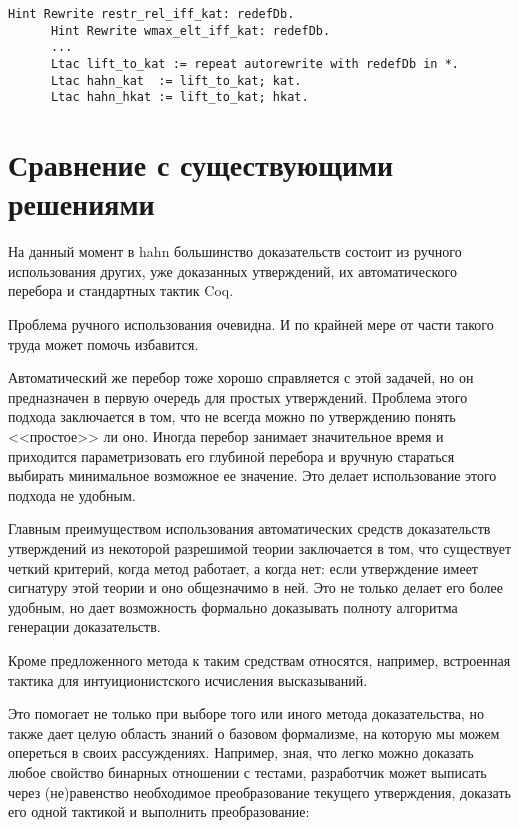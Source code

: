 \documentclass[times
              ,specification
              ,annotation
              ]{itmo-student-thesis}
\begin{document}
      \begin{lstlisting}[float=!h, gobble=4,
        caption={Переопределение тактик \coqe{h(kat)}, для автоматической замены старых определений на новые}, label={lst:define_lift}]
      Hint Rewrite restr_rel_iff_kat: redefDb.
      Hint Rewrite wmax_elt_iff_kat: redefDb.
      ...
      Ltac lift_to_kat := repeat autorewrite with redefDb in *.
      Ltac hahn_kat  := lift_to_kat; kat.
      Ltac hahn_hkat := lift_to_kat; hkat.
      \end{lstlisting}

  \section{Сравнение с существующими решениями}

    На данный момент в hahn большинство доказательств состоит из ручного использования других, уже
    доказанных утверждений, их автоматического перебора и стандартных тактик Coq.

    Проблема ручного использования очевидна. И по крайней мере от части такого труда 
    может помочь избавится.

    Автоматический же перебор тоже хорошо справляется с этой задачей, но он предназначен в первую
    очередь для простых утверждений. Проблема этого подхода заключается в том, что не всегда можно по
    утверждению понять <<простое>> ли оно. Иногда перебор занимает значительное
    время и приходится параметризовать его глубиной перебора и вручную стараться выбирать
    минимальное возможное ее значение. Это делает использование этого подхода не удобным.

    Главным преимуществом использования автоматических средств доказательств утверждений из некоторой
    разрешимой теории заключается в том, что существует четкий критерий, когда метод работает, а когда
    нет: если утверждение имеет сигнатуру этой теории и оно общезначимо в ней. Это не только делает его
    более удобным, но дает возможность формально доказывать полноту алгоритма генерации доказательств.

    Кроме предложенного метода к таким средствам относятся, например, встроенная тактика 
    \cite{coq_man} для интуиционистского исчисления высказываний.

    Это помогает не только при выборе того или иного метода доказательства, но также дает целую область
    знаний о базовом формализме, на которую мы можем опереться в своих рассуждениях. Например, зная, что
    легко можно доказать любое свойство бинарных отношении с тестами, разработчик может выписать через
    (не)равенство необходимое преобразование текущего утверждения, доказать его одной тактикой
     и выполнить преобразование:
\end{document}
